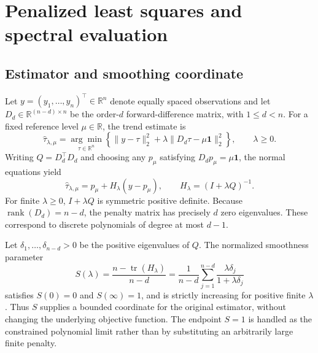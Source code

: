 \section{Penalized least squares and spectral evaluation}
\subsection{Estimator and smoothing coordinate}
Let $y=(y_1,\ldots,y_n)^\top\in\mathbb{R}^n$ denote equally spaced observations and let $D_d\in\mathbb{R}^{(n-d)\times n}$ be the order-$d$ forward-difference matrix, with $1\leq d<n$. For a fixed reference level $\mu\in\mathbb{R}$, the trend estimate is
\begin{equation}\label{eq:pls}
\widehat{\tau}_{\lambda,\mu}=
\underset{\tau\in\mathbb{R}^n}{\arg\min}
\left\{\|y-\tau\|_2^2+
\lambda\|D_d\tau-\mu\mathbf{1}\|_2^2\right\},
\qquad\lambda\geq0.
\end{equation}
Writing $Q=D_d^\top D_d$ and choosing any $p_\mu$ satisfying $D_dp_\mu=\mu\mathbf1$, the normal equations yield
\begin{equation}\label{eq:hat}
\widehat{\tau}_{\lambda,\mu}
=p_\mu+H_\lambda(y-p_\mu),\qquad
H_\lambda=(I+\lambda Q)^{-1}.
\end{equation}
For finite $\lambda\geq0$, $I+\lambda Q$ is symmetric positive definite. Because $\operatorname{rank}(D_d)=n-d$, the penalty matrix has precisely $d$ zero eigenvalues. These correspond to discrete polynomials of degree at most $d-1$.

Let $\delta_1,\ldots,\delta_{n-d}>0$ be the positive eigenvalues of $Q$. The normalized smoothness parameter
\begin{equation}\label{eq:smoothness}
S(\lambda)=\frac{n-\operatorname{tr}(H_\lambda)}{n-d}
=\frac1{n-d}\sum_{j=1}^{n-d}
\frac{\lambda\delta_j}{1+\lambda\delta_j}
\end{equation}
satisfies $S(0)=0$ and $S(\infty)=1$, and is strictly increasing for positive finite $\lambda$. Thus $S$ supplies a bounded coordinate for the original estimator, without changing the underlying objective function. The endpoint $S=1$ is handled as the constrained polynomial limit rather than by substituting an arbitrarily large finite penalty.


